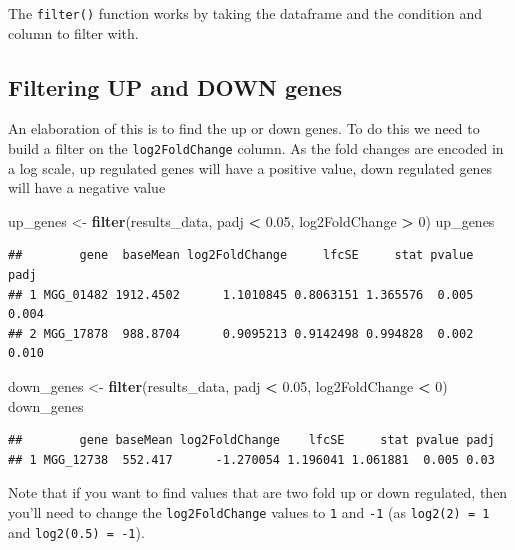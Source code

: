 \documentclass[]{book}
\newenvironment{Shaded}{\begin{snugshade}}{\end{snugshade}}
\newcommand{\DecValTok}[1]{\textcolor[rgb]{0.00,0.00,0.81}{#1}}
\newcommand{\FloatTok}[1]{\textcolor[rgb]{0.00,0.00,0.81}{#1}}
\newcommand{\KeywordTok}[1]{\textcolor[rgb]{0.13,0.29,0.53}{\textbf{#1}}}
\newcommand{\NormalTok}[1]{#1}
\newcommand{\OperatorTok}[1]{\textcolor[rgb]{0.81,0.36,0.00}{\textbf{#1}}}
\newcommand{\StringTok}[1]{\textcolor[rgb]{0.31,0.60,0.02}{#1}}
\begin{document}
The \texttt{filter()} function works by taking the dataframe and the condition and column to filter with.

\hypertarget{filtering-up-and-down-genes}{%
\subsection{Filtering UP and DOWN genes}\label{filtering-up-and-down-genes}}

An elaboration of this is to find the up or down genes. To do this we need to build a filter on the \texttt{log2FoldChange} column. As the fold changes are encoded in a log scale, up regulated genes will have a positive value, down regulated genes will have a negative value

\begin{Shaded}
\begin{Highlighting}[]
\NormalTok{up_genes <-}\StringTok{ }\KeywordTok{filter}\NormalTok{(results_data, padj }\OperatorTok{<}\StringTok{ }\FloatTok{0.05}\NormalTok{, log2FoldChange }\OperatorTok{>}\StringTok{ }\DecValTok{0}\NormalTok{)}
\NormalTok{up_genes}
\end{Highlighting}
\end{Shaded}

\begin{verbatim}
##        gene  baseMean log2FoldChange     lfcSE     stat pvalue  padj
## 1 MGG_01482 1912.4502      1.1010845 0.8063151 1.365576  0.005 0.004
## 2 MGG_17878  988.8704      0.9095213 0.9142498 0.994828  0.002 0.010
\end{verbatim}

\begin{Shaded}
\begin{Highlighting}[]
\NormalTok{down_genes <-}\StringTok{ }\KeywordTok{filter}\NormalTok{(results_data, padj }\OperatorTok{<}\StringTok{ }\FloatTok{0.05}\NormalTok{, log2FoldChange }\OperatorTok{<}\StringTok{ }\DecValTok{0}\NormalTok{)}
\NormalTok{down_genes}
\end{Highlighting}
\end{Shaded}

\begin{verbatim}
##        gene baseMean log2FoldChange    lfcSE     stat pvalue padj
## 1 MGG_12738  552.417      -1.270054 1.196041 1.061881  0.005 0.03
\end{verbatim}

Note that if you want to find values that are two fold up or down regulated, then you'll need to change the \texttt{log2FoldChange} values to \texttt{1} and \texttt{-1} (as \texttt{log2(2)\ =\ 1} and \texttt{log2(0.5)\ =\ -1}).
\end{document}
